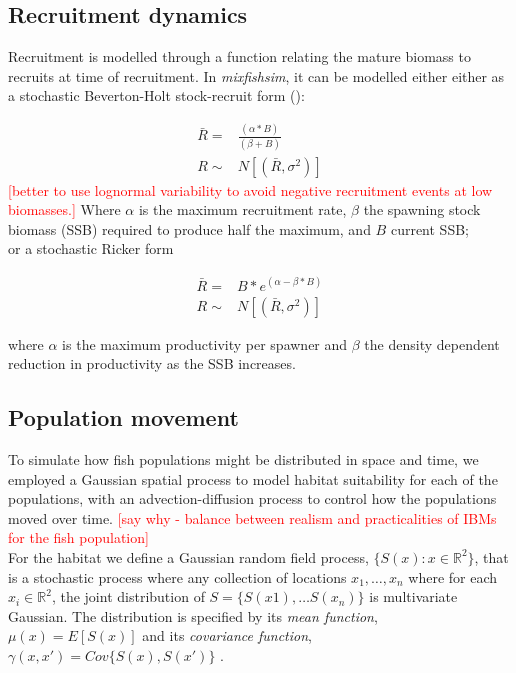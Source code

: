 \documentclass[review]{elsarticle}
\begin{document}
\subsection{Recruitment dynamics}

Recruitment is modelled through a function relating the mature biomass to
recruits at time of recruitment. In \emph{mixfishsim}, it can be modelled
either either as a stochastic Beverton-Holt stock-recruit form
(\cite{Beverton1957}): 

\begin{equation*}
	\begin{split}
	\bar{R} = & \frac{(\alpha * B)}{(\beta + B)} \\
	     R \sim & N[(\bar{R},\sigma^2)]
	\end{split}
\end{equation*}
\textcolor{red}{[better to use lognormal variability to avoid negative
	recruitment events at low biomasses.]} Where $\alpha$ is the maximum
recruitment rate, $\beta$ the spawning stock biomass (SSB) required to produce
half the maximum, and $B$ current SSB; \\

or a stochastic Ricker form \cite{Ricker1954}

\begin{equation*}
	\begin{split}
	\bar{R} = & B * e^{(\alpha - \beta * B)} \\	
   	     R \sim & N[(\bar{R},\sigma^2)]
	\end{split}
\end{equation*}

where $\alpha$ is the maximum productivity per spawner and $\beta$ the density
dependent reduction in productivity as the SSB increases.

\subsection{Population movement}

To simulate how fish populations might be distributed in space and time, we
employed a Gaussian spatial process to model habitat suitability for each of
the populations, with an advection-diffusion process to control how the
populations moved over time. \textcolor{red}{[say why - balance between realism
	and practicalities of IBMs for the fish population]}\\

For the habitat we define a Gaussian random field process, $\{S(x) : x \in
\mathbb{R}^2\}$, that is a stochastic process where any collection of locations
$x_{1}, \dots, x_{n}$ where for each $x_{i} \in \mathbb{R}^2$, the joint
distribution of $S = \{S(x1),\dots S(x_{n})\}$ is multivariate Gaussian. The
distribution is specified by its \textit{mean function}, $\mu(x) = E[S(x)]$ and
its \textit{covariance function}, $\gamma(x,x') = Cov\{S(x),S(x')\}$
\cite{Diggle2007}.\\
\end{document}
